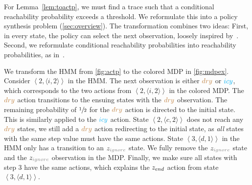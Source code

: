 \documentclass[runningheads]{llncs}
\newcommand{\actps}[3]{\left\langle #1, \langle #2, #3\rangle \right\rangle}
\newcommand{\icy}{{\color{cyan} icy}\xspace}
\newcommand{\dry}{{\color{brown} dry}\xspace}
\newcommand{\ig}{z_{\color{gray} ignore}\xspace}
\newcommand{\en}{z_{\color{black} end}\xspace}
\begin{document}
For Lemma~\ref{lem:toactp}, we must find a trace such that a conditional reachability probability exceeds a threshold. We reformulate this into a policy synthesis problem (\cref{sec:overview}). The transformation combines two ideas: First, in every state, the policy can select the next observation, loosely inspired by~\cite{DBLP:conf/tacas/BadingsVJSJ24}. Second, we reformulate conditional reachability probabilities into  reachability probabilities, as in~\cite{jungesRuntimeMonitorsMarkov2021,baierComputingConditionalProbabilities2014}.
\begin{example}
    \label{ex:policysynthesis}
    We transform the HMM from \cref{fig:actp} to the colored MDP in \cref{fig:mdpex}. Consider $\actps{2}{i}{2}$ in the  HMM.
    The next observation is either $\dry$ or $\icy$, which corresponds to the two actions from $\actps{2}{i}{2}$ in the colored MDP.
    The $\dry$ action transitions to the ensuing states with the $\dry$ observation.
    The remaining probability of $\sfrac{1}{2}$ for the $\dry$ action is directed to the initial state.
    This is similarly applied to the $\icy$ action.
    State $\actps{2}{c}{2}$ does not reach any $\dry$ states, we still add a $\dry$ action redirecting to the initial state, as \emph{all} states with the same step value must have the same actions.
    State $\actps{3}{d}{1}$ in the HMM only has a transition to an $\ig$ state. We fully remove the $\ig$ state and the $\ig$ observation in the MDP. Finally, we make sure all states with step 3 have the same actions, which explains the $\en$ action from state $\actps{3}{d}{1}$.
\end{example}
\end{document}
